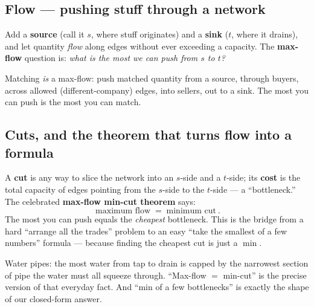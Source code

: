 \subsection{Flow --- pushing stuff through a network}

Add a \textbf{source} (call it $s$, where stuff originates) and a \textbf{sink}
($t$, where it drains), and let quantity \emph{flow} along edges without ever
exceeding a capacity. The \textbf{max-flow} question is: \emph{what is the most we
can push from $s$ to $t$?}

\begin{center}
\end{center}

Matching \emph{is} a max-flow: push matched quantity from a source, through
buyers, across allowed (different-company) edges, into sellers, out to a sink.
The most you can push is the most you can match.

\subsection{Cuts, and the theorem that turns flow into a formula}

A \textbf{cut} is any way to slice the network into an $s$-side and a $t$-side; its
\textbf{cost} is the total capacity of edges pointing from the $s$-side to the
$t$-side --- a ``bottleneck.'' The celebrated \textbf{max-flow min-cut theorem}
says:
\[
\boxed{\ \text{maximum flow} \;=\; \text{minimum cut}\ .}
\]
The most you can push equals the \emph{cheapest} bottleneck. This is the bridge
from a hard ``arrange all the trades'' problem to an easy ``take the smallest of a
few numbers'' formula --- because finding the cheapest cut is just a $\min$.

\begin{intu}
Water pipes: the most water from tap to drain is capped by the narrowest section
of pipe the water must all squeeze through. ``Max-flow $=$ min-cut'' is the precise
version of that everyday fact. And ``min of a few bottlenecks'' is exactly the
shape of our closed-form answer.
\end{intu}

